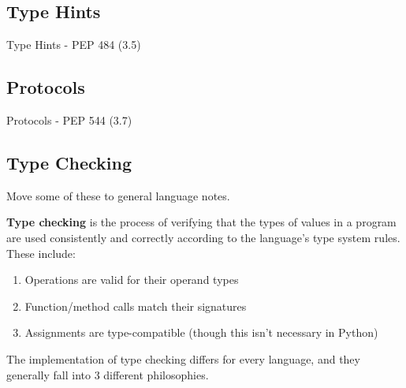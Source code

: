 \subsection{Type Hints}
  Type Hints - PEP 484 (3.5) 

\subsection{Protocols}

  Protocols - PEP 544 (3.7) 

\subsection{Type Checking}

  \begin{question}[To Do]
    Move some of these to general language notes. 
  \end{question}

  \begin{definition}
    \textbf{Type checking} is the process of verifying that the types of values in a program are used consistently and correctly according to the language's type system rules. These include: 
    \begin{enumerate}
      \item Operations are valid for their operand types 
      \item Function/method calls match their signatures 
      \item Assignments are type-compatible (though this isn't necessary in Python) 
    \end{enumerate}
  \end{definition}

  The implementation of type checking differs for every language, and they generally fall into 3 different philosophies. 


